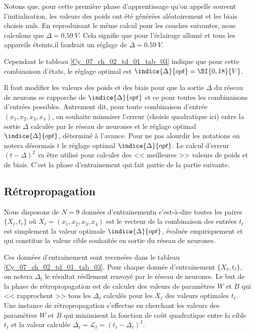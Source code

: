 Notons que, pour cette première phase d'apprentissage qu'on appelle souvent l'initialisation, les valeurs des poids ont été générées aléatoirement et les biais choisis nuls. En reproduisant le même calcul pour les couches suivantes, nous calculons que $\Delta= \SI{0,59}{V}$. Cela signifie que pour l'éclairage allumé et tous les appareils éteints,il faudrait un réglage de $\Delta= \SI{0,59}{V}$.

Cependant le tableau \ref{Cy_07_ch_02_td_01_tab_03} indique que pour cette combinaison d'états, le réglage optimal est $\indice{\Delta}{opt} = \SI{0,18}{V}$.

Il faut modifier les valeurs des poids et des biais pour que la sortie $\Delta$ du réseau de neurons se rapporche de $\indice{\Delta}{opt}$ et ce pour toutes les combinaisons d'entrées possibles. Autrement dit, pour toute combinaison d'entrée $\left(x_1, x_2, x_3, x_4 \right)$, on souhaite minmiser l'erreur (choisie quadratique ici) entre la sortie $\Delta$ calculée par le réseau de neurones et le réglage optimal $\indice{\Delta}{opt}$, déterminé à l'avance. 
Pour ne pas alourdir les notations on notera désormais $t$ le réglage optimal $\indice{\Delta}{opt}$. Le calcul d'erreur $(t-\Delta)^2$ va être utilisé pour calculer des << meilleures >> valeurs de poids et de biais. C'est la phase d'entrainement qui fait partie de la partie suivante.


\subsection*{Rétropropagation }
Nous disposons de $N=9$ données d'entrainementn c'est-à-dire toutes les paires $\{ X_{\ell},t_{\ell}\}$ où 
$X_{\ell} = \left(x_1, x_2, x_3, x_4 \right)$ est le vecteur de la combinaison des entrées $t_{\ell}$ est simplement la valeur optimale $\indice{\Delta}{opt}$, évaluée empiriquement et qui constitue la valeur cible souhaitée en sortie du réseau de neurones.
 
 Ces données d'entrainement sont recensées dans le tableau \ref{Cy_07_ch_02_td_01_tab_03}. Pour chaque donnée d'entrainement  $\{ X_{\ell},t_{\ell}\}$, on notera $\Delta_t$ le résultat réellement renvoyé par le réseau de neurones. Le but de la phase de rétropropagation est de calculer des valeurs de paramètres 
 $W$ et $B$ qui << rapprochent >> tous les $\Delta_{\ell}$ calculés pour les $X_{\ell}$ des valeurs optimales 
 $t_{\ell}$. Une instance de rétropropagation s'effectue en cherchant les valeurs des paramètres $W$ et $B$ qui minimisent la fonction de coût quadratique entre la cible  $t_{\ell}$ et la valeur calculée 
 $\Delta_{\ell} = \mathcal{L}_{\ell} = \left(t_{\ell} - \Delta_{\ell}\right)^2$.
 
